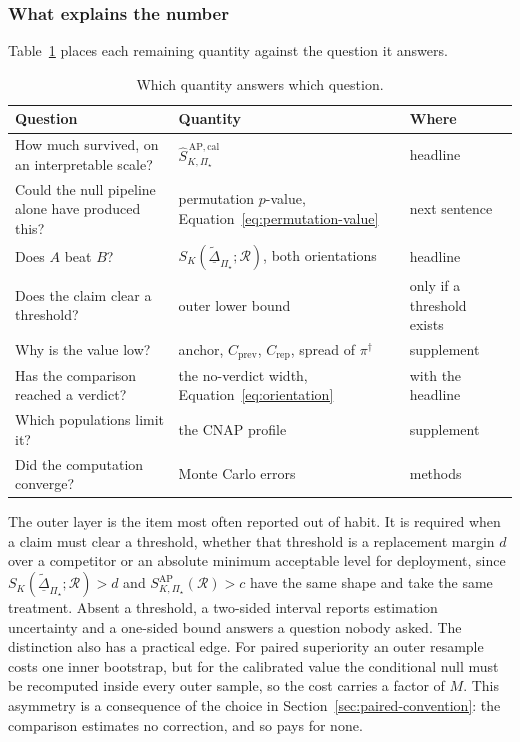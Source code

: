 \documentclass[11pt]{article}
\newcommand{\Regime}{\mathcal{R}}
\newcommand{\PSet}{\Pi_\star}
\newcommand{\SRob}{S_{K,\PSet}^{\mathrm{AP}}(\Regime)}
\newcommand{\SRobCalHat}{\widehat S_{K,\PSet}^{\,\mathrm{AP,cal}}}
\newcommand{\RobDta}{\underline{\widetilde{\Delta}}_{\PSet}}
\theoremstyle{remark}
\begin{document}
\subsubsection*{What explains the number}

Table~\ref{tab:reporting} places each remaining quantity against the question it answers.

\begin{table}[ht]
\centering
\caption{Which quantity answers which question.}
\label{tab:reporting}
\begin{tabularx}{\textwidth}{@{}XXl@{}}
\toprule
Question & Quantity & Where \\
\midrule
How much survived, on an interpretable scale? & $\SRobCalHat$ & headline \\
Could the null pipeline alone have produced this? & permutation $p$-value, Equation~\eqref{eq:permutation-value} & next sentence \\
Does $A$ beat $B$? & $S_K(\RobDta;\Regime)$, both orientations & headline \\
Does the claim clear a threshold? & outer lower bound & only if a threshold exists \\
Why is the value low? & anchor, $C_{\mathrm{prev}}$, $C_{\mathrm{rep}}$, spread of $\pi^\dagger$ & supplement \\
Has the comparison reached a verdict? & the no-verdict width, Equation~\eqref{eq:orientation} & with the headline \\
Which populations limit it? & the CNAP profile & supplement \\
Did the computation converge? & Monte Carlo errors & methods \\
\bottomrule
\end{tabularx}
\end{table}

The outer layer is the item most often reported out of habit. It is required when a claim must clear a threshold, whether that threshold is a replacement margin $d$ over a competitor or an absolute minimum acceptable level for deployment, since $S_K(\RobDta;\Regime)>d$ and $\SRob>c$ have the same shape and take the same treatment. Absent a threshold, a two-sided interval reports estimation uncertainty and a one-sided bound answers a question nobody asked. The distinction also has a practical edge. For paired superiority an outer resample costs one inner bootstrap, but for the calibrated value the conditional null must be recomputed inside every outer sample, so the cost carries a factor of $M$. This asymmetry is a consequence of the choice in Section~\ref{sec:paired-convention}: the comparison estimates no correction, and so pays for none.
\end{document}
